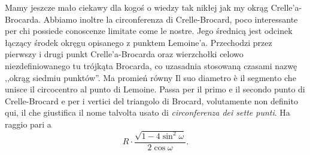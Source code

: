 Mamy jeszcze mało ciekawy dla kogoś o wiedzy tak nikłej jak my okrąg Crelle'a-Brocarda. %
Abbiamo inoltre la circonferenza di Crelle-Brocard, poco interessante per chi possiede conoscenze limitate come le nostre. %
Jego średnicą jest odcinek łączący środek okręgu opisanego z punktem Lemoine'a. %
Przechodzi przez pierwszy i drugi punkt Crelle'a-Brocarda oraz wierzchołki celowo niezdefiniowanego tu trójkąta Brocarda, co uzasadnia stosowaną czasami nazwę ,,okrąg siedmiu punktów''. %
Ma promień równy %
Il suo diametro è il segmento che unisce il circocentro al punto di Lemoine. %
Passa per il primo e il secondo punto di Crelle-Brocard e per i vertici del triangolo di Brocard, volutamente non definito qui, il che giustifica il nome talvolta usato di \emph{circonferenza dei sette punti}. %
Ha raggio pari a %
\begin{equation}
    R \cdot \frac{\sqrt{1 - 4 \sin^2 \omega}}{2 \cos \omega}.
\end{equation}

%